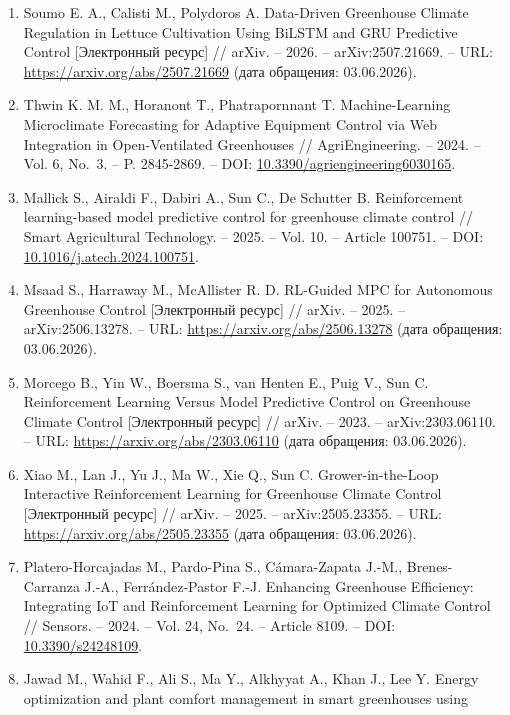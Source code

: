 \documentclass[a4paper,14pt]{extarticle}
\begin{document}
\begin{enumerate}
\item
  Soumo E. A., Calisti M., Polydoros A. Data-Driven Greenhouse Climate
  Regulation in Lettuce Cultivation Using BiLSTM and GRU Predictive
  Control {[}Электронный ресурс{]} // arXiv. -- 2026. --
  arXiv:2507.21669. -- URL: \url{https://arxiv.org/abs/2507.21669} (дата
  обращения: 03.06.2026).
\item
  Thwin K. M. M., Horanont T., Phatrapornnant T. Machine-Learning
  Microclimate Forecasting for Adaptive Equipment Control via Web
  Integration in Open-Ventilated Greenhouses // AgriEngineering. --
  2024. -- Vol. 6, No.~3. -- P. 2845-2869. -- DOI:
  \href{https://doi.org/10.3390/agriengineering6030165}{10.3390/agriengineering6030165}.
\item
  Mallick S., Airaldi F., Dabiri A., Sun C., De Schutter B.
  Reinforcement learning-based model predictive control for greenhouse
  climate control // Smart Agricultural Technology. -- 2025. -- Vol. 10.
  -- Article 100751. -- DOI:
  \href{https://doi.org/10.1016/j.atech.2024.100751}{10.1016/j.atech.2024.100751}.
\item
  Msaad S., Harraway M., McAllister R. D. RL-Guided MPC for Autonomous
  Greenhouse Control {[}Электронный ресурс{]} // arXiv. -- 2025. --
  arXiv:2506.13278. -- URL: \url{https://arxiv.org/abs/2506.13278} (дата
  обращения: 03.06.2026).
\item
  Morcego B., Yin W., Boersma S., van Henten E., Puig V., Sun C.
  Reinforcement Learning Versus Model Predictive Control on Greenhouse
  Climate Control {[}Электронный ресурс{]} // arXiv. -- 2023. --
  arXiv:2303.06110. -- URL: \url{https://arxiv.org/abs/2303.06110} (дата
  обращения: 03.06.2026).
\item
  Xiao M., Lan J., Yu J., Ma W., Xie Q., Sun C. Grower-in-the-Loop
  Interactive Reinforcement Learning for Greenhouse Climate Control
  {[}Электронный ресурс{]} // arXiv. -- 2025. -- arXiv:2505.23355. --
  URL: \url{https://arxiv.org/abs/2505.23355} (дата обращения:
  03.06.2026).
\item
  Platero-Horcajadas M., Pardo-Pina S., Cámara-Zapata J.-M.,
  Brenes-Carranza J.-A., Ferrández-Pastor F.-J. Enhancing Greenhouse
  Efficiency: Integrating IoT and Reinforcement Learning for Optimized
  Climate Control // Sensors. -- 2024. -- Vol. 24, No.~24. -- Article
  8109. -- DOI:
  \href{https://doi.org/10.3390/s24248109}{10.3390/s24248109}.
\item
  Jawad M., Wahid F., Ali S., Ma Y., Alkhyyat A., Khan J., Lee Y. Energy
  optimization and plant comfort management in smart greenhouses using

\end{enumerate}
\end{document}
